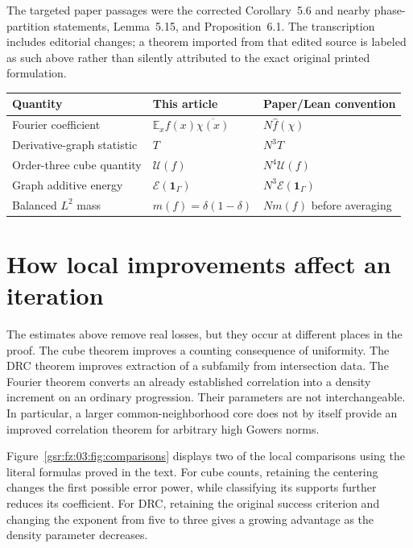 \documentclass[11pt,letterpaper]{article}
\numberwithin{equation}{section}
\theoremstyle{definition}
\theoremstyle{remark}
\newcommand{\E}{\mathbb E}
\newcommand{\one}{\mathbf 1}
\newcommand{\1}{\mathbf 1}
\newcommand{\U}{\mathcal U}
\newcommand{\calE}{\mathcal E}
\newcommand{\srctag}[1]{\texorpdfstring{\enspace\textup{[#1]}}{ [#1]}}
\newcommand{\srcnote}[2]{\par\noindent{\small\textit{Source #1, delivered #2.}}\par}
\begin{document}
The targeted paper passages were the corrected Corollary~5.6 and nearby phase-partition statements, Lemma~5.15, and Proposition~6.1. The transcription includes editorial changes; a theorem imported from that edited source is labeled as such above rather than silently attributed to the exact original printed formulation.

\begin{center}
\begin{tabular}{lll}
\toprule
Quantity & This article & Paper/Lean convention\\
\midrule
Fourier coefficient & $\E_x f(x)\overline{\chi(x)}$ & $N\widehat f(\chi)$\\
Derivative-graph statistic & $T$ & $N^3T$\\
Order-three cube quantity & $\U(f)$ & $N^4\U(f)$\\
Graph additive energy & $\calE(\one_\Gamma)$ & $N^3\calE(\one_\Gamma)$\\
Balanced $L^2$ mass & $m(f)=\delta(1-\delta)$ & $Nm(f)$ before averaging\\
\bottomrule
\end{tabular}
\end{center}

\section[{How local improvements affect an iteration\srctag{03}}]{How local improvements affect an iteration}\label{gsr:fz:03:sec:d9}
\srcnote{03}{Section 9}
\label{gsr:fz:03:sec:impact}

The estimates above remove real losses, but they occur at different places
in the proof. The cube theorem improves a counting consequence of
uniformity. The DRC theorem improves extraction of a subfamily from
intersection data. The Fourier theorem converts an already established
correlation into a density increment on an ordinary progression.
Their parameters are not interchangeable. In particular, a larger
common-neighborhood core does not by itself provide an improved
correlation theorem for arbitrary high Gowers norms.

Figure~\ref{gsr:fz:03:fig:comparisons} displays two of the local comparisons using
the literal formulas proved in the text. For cube counts, retaining the
centering changes the first possible error power, while classifying its
supports further reduces its coefficient. For DRC, retaining the
original success criterion and changing the exponent from five to three
gives a growing advantage as the density parameter decreases.
\end{document}
